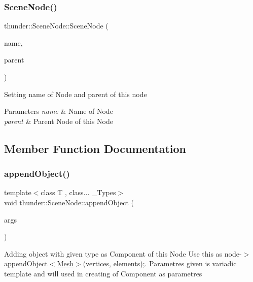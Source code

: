 \subsubsection{\texorpdfstring{Scene\+Node()}{SceneNode()}\hspace{0.1cm}{\footnotesize\ttfamily [2/2]}}
{\footnotesize\ttfamily thunder\+::\+Scene\+Node\+::\+Scene\+Node (\begin{DoxyParamCaption}\item[{const std\+::string \&}]{name,  }\item[{std\+::shared\+\_\+ptr$<$ \mbox{\hyperlink{classthunder_1_1_scene_node}{Scene\+Node}} $>$}]{parent }\end{DoxyParamCaption})}

Setting name of Node and parent of this node


\begin{DoxyParams}{Parameters}
{\em name} & Name of Node \\
\hline
{\em parent} & Parent Node of this Node \\
\hline
\end{DoxyParams}


\subsection{Member Function Documentation}
\mbox{\label{classthunder_1_1_scene_node_a2a45fdece02c7ae3ae62805054f63ae1}} 
\subsubsection{\texorpdfstring{append\+Object()}{appendObject()}}
{\footnotesize\ttfamily template$<$class T , class... \+\_\+\+Types$>$ \\
void thunder\+::\+Scene\+Node\+::append\+Object (\begin{DoxyParamCaption}\item[{\+\_\+\+Types \&\&...}]{args }\end{DoxyParamCaption})\hspace{0.3cm}{\ttfamily [inline]}}

Adding object with given type as Component of this Node Use this as {\ttfamily node-\/$>$append\+Object$<$\mbox{\hyperlink{classthunder_1_1_mesh}{Mesh}}$>$(vertices, elements);}. Parametres given is variadic template and will used in creating of Component as parametres


